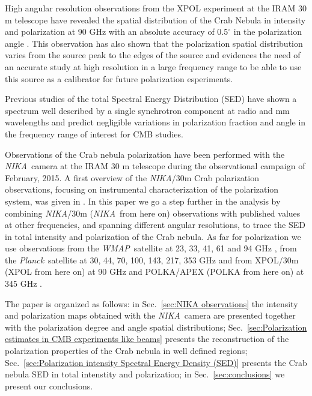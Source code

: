 \documentclass[twocolumn,traditabstract]{aa}
\def\NIKA{\textit{NIKA}}
\def\Planck{\textit{Planck}}
\def\WMAP{\textit{WMAP}}
\begin{document}
High angular resolution observations from the XPOL experiment \citep{thum2008} at the
IRAM 30 m telescope have revealed the spatial distribution of the Crab Nebula in
intensity and polarization at 90 GHz with an absolute accuracy of 0.5$^{\circ}$
in the polarization angle \citep{aumont2010}.
This observation has also shown that the polarization spatial distribution varies from the source peak
to the edges of the source and evidences the need of an accurate study at high resolution in a large frequency range to be able to use this source as a calibrator for future polarization esperiments.


Previous studies \citep{macias2010} of the total Spectral Energy Distribution
(SED) have shown a spectrum well described by a single
synchrotron component at radio and mm wavelengths and predict negligible
variations in polarization fraction and angle in the frequency range of interest
for CMB studies.
 
Observations of the Crab nebula polarization have been performed with the
\NIKA\ camera \citep{monfardini2010,catalano2014,monfardini2014} at the IRAM 30
m telescope during the observational campaign of February, 2015. A first
overview of the \NIKA/30m Crab polarization observations,
focusing on instrumental characterization of the polarization system, was given in
\cite{2016JLTP..184..724R}. In this paper we go a step further in the analysis
by combining \NIKA/30m (\NIKA\ from here on) observations with published values at other frequencies, and spanning different angular resolutions, to trace the
SED in total intensity and polarization of the Crab nebula. As far for polarization we use observations from the \WMAP\
satellite at 23, 33, 41, 61 and 94 GHz \citep{2011ApJS..192...19W}, from the
\Planck\ satellite at 30, 44, 70, 100, 143, 217, 353 GHz and from XPOL/30m (XPOL from here on) at 90 GHz
\citep{aumont2010} and POLKA/APEX (POLKA from here on) at 345 GHz \citep{2014PASP..126.1027W}. 


The paper is organized as follows: in Sec.~\ref{sec:NIKA observations} the
intensity and polarization maps obtained with the \NIKA\ camera are presented
together with the polarization degree and angle spatial distributions;
Sec.~\ref{sec:Polarization estimates in CMB experiments like beams} presents the
reconstruction of the polarization properties of the Crab nebula in well defined
regions; Sec.~\ref{sec:Polarization intensity Spectral Energy Density (SED)}
presents the Crab nebula SED in total intenstity and polarization; in
Sec.~\ref{sec:conclusions} we present our conclusions.
 
\end{document}
